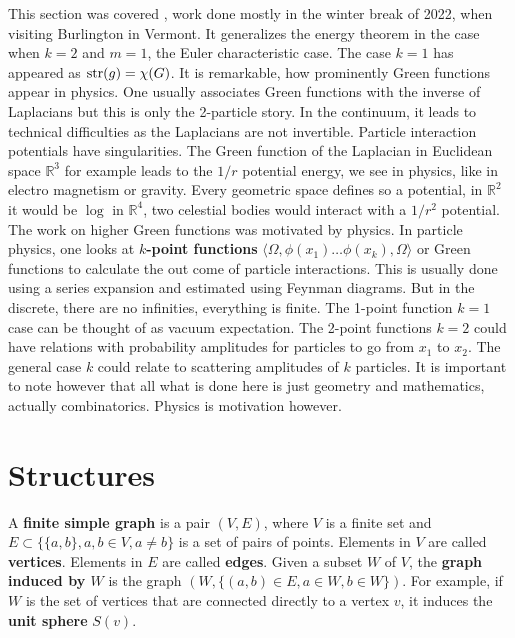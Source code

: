 \documentclass[12pt]{amsart}
\begin{document}
This section was covered \cite{CharacteristicTopologicalInvariants}, work done mostly 
in the winter break of 2022, when visiting Burlington in Vermont. It generalizes
the energy theorem in the case when $k=2$ and $m=1$, the Euler characteristic case. 
The case $k=1$ has appeared as ${\rm str}(g)=\chi(G)$. 
It is remarkable, how prominently Green functions appear in physics. One usually 
associates Green functions with the inverse of Laplacians but this is only the 2-particle
story. In the continuum, it leads to
technical difficulties as the Laplacians are not invertible. Particle interaction 
potentials have singularities.  The Green function of the Laplacian in Euclidean space 
$\mathbb{R}^3$ for example leads to the $1/r$ potential energy, we see in physics, like in 
electro magnetism or gravity.  Every geometric space defines so a potential, in $\mathbb{R}^2$ 
it would be $\log$ in $\mathbb{R}^4$, two celestial bodies would interact with a $1/r^2$ 
potential. The work on higher Green functions was motivated by physics. In particle physics,
one looks at {\bf $k$-point functions} $\langle \Omega,\phi(x_1) \dots \phi(x_k), \Omega \rangle$
or Green functions to calculate the out come of particle interactions. 
This is usually done using a series expansion and estimated using Feynman diagrams. But in 
the discrete, there are no infinities, everything is finite. The 1-point function $k=1$ case 
can be thought of as vacuum expectation. The 2-point functions  $k=2$ could have relations with
probability amplitudes for particles to go from $x_1$ to $x_2$. The general case $k$
could relate to scattering amplitudes of $k$ particles. It is important to note
however that all what is done here is just geometry and mathematics, actually combinatorics.
Physics is motivation however.

 \vfill \pagebreak
                         \section*{Structures}


\vspace{3mm}
A {\bf finite simple graph} is a pair $(V,E)$, where $V$ is a finite set and $E \subset \{ \{ a,b \}, a,b \in V, a \neq b \}$
is a set of pairs of points. Elements in $V$ are called {\bf vertices}. Elements in $E$ are called {\bf edges}. 
Given a subset $W$ of $V$, the {\bf graph induced by $W$} is the graph 
$(W,\{ (a,b) \in E, a \in W, b \in W \})$. For example, if $W$ is the set 
of vertices that are connected directly to a vertex $v$, it induces the {\bf unit sphere} $S(v)$. 
\end{document}
